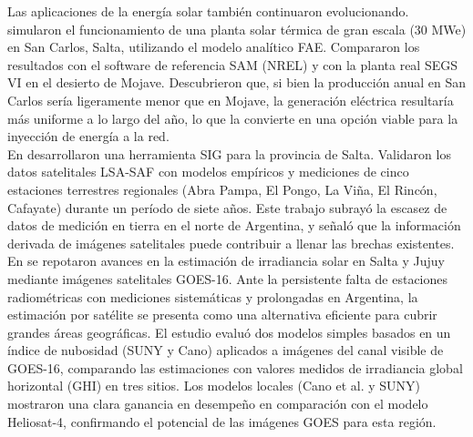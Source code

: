 Las aplicaciones de la energía solar también continuaron evolucionando. \cite{Hongn2018} simularon el funcionamiento de una planta solar térmica de gran escala (30 MWe) en San Carlos, Salta, utilizando el modelo analítico FAE. Compararon los resultados con el software de referencia SAM (NREL) y con la planta real SEGS VI en el desierto de Mojave. Descubrieron que, si bien la producción anual en San Carlos sería ligeramente menor que en Mojave, la generación eléctrica resultaría más uniforme a lo largo del año, lo que la convierte en una opción viable para la inyección de energía a la red.\\



En \cite{SarmientoBarbieri2019} desarrollaron una herramienta SIG para la provincia de Salta. Validaron los datos satelitales LSA-SAF con modelos empíricos y mediciones de cinco estaciones terrestres regionales (Abra Pampa, El Pongo, La Viña, El Rincón, Cafayate) durante un período de siete años. Este trabajo subrayó la escasez de datos de medición en tierra en el norte de Argentina, y señaló que la información derivada de imágenes satelitales puede contribuir a llenar las brechas existentes.\\





 En \cite{Ledesma2023} se repotaron avances en la estimación de irradiancia solar en Salta y Jujuy mediante imágenes satelitales GOES-16. Ante la persistente falta de estaciones radiométricas con mediciones sistemáticas y prolongadas en Argentina, la estimación por satélite se presenta como una alternativa eficiente para cubrir grandes áreas geográficas. El estudio evaluó dos modelos simples basados en un índice de nubosidad (SUNY y Cano) aplicados a imágenes del canal visible de GOES-16, comparando las estimaciones con valores medidos de irradiancia global horizontal (GHI) en tres sitios. Los modelos locales (Cano et al. y SUNY) mostraron una clara ganancia en desempeño en comparación con el modelo Heliosat-4, confirmando el potencial de las imágenes GOES para esta región.

